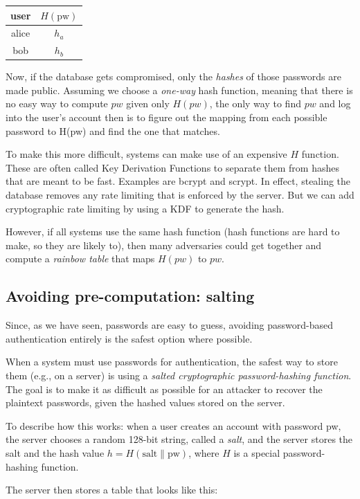 \begin{tabular}{c|c}
  user & $H(\text{pw})$ \\
	\hline
	alice & $h_a$ \\
	bob & $h_b$ \\
\end{tabular}

Now, if the database gets compromised, only the \textit{hashes} of those passwords are made public. Assuming we choose a \textit{one-way} hash function, meaning that there is no easy way to compute $pw$ given only $H(pw)$, the only way to find $pw$ and log into the user's account then is to figure out the mapping from each possible password to H(pw) and find the one that matches. 

To make this more difficult, systems can make use of an expensive $H$ function. These are often called Key Derivation Functions to separate them from hashes that are meant to be fast. Examples are bcrypt and scrypt. In effect, stealing the database removes any rate limiting that is enforced by the server. But we can add cryptographic rate limiting by using a KDF to generate the hash.

However, if all systems use the same hash function (hash functions are hard to make, so they are likely to), then many adversaries could get together and compute a \textit{rainbow table} that maps $H(pw)$ to $pw$. 

\subsection{Avoiding pre-computation: salting}
\fi

Since, as we have seen, passwords are easy to guess, avoiding 
password-based authentication entirely is the safest option where
possible.

When a system must use passwords for authentication, the safest
way to store them (e.g., on a server) is using a
\emph{salted cryptographic password-hashing function}.
The goal is to make it as difficult as possible for an attacker
to recover the plaintext passwords, given the hashed values stored on the server.

To describe how this works: when a user creates an account with password pw,
the server chooses a random 128-bit string, called a \emph{salt},
and the server stores the salt and the hash value
$h=H(\text{salt}\|\text{pw})$, where $H$ is a special password-hashing function.

The server then stores a table that looks like this:

